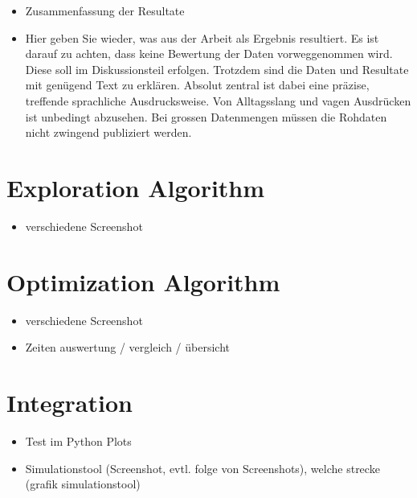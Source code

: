 \begin{itemize}
    \item Zusammenfassung der Resultate
    \item Hier geben Sie wieder, was aus der Arbeit als Ergebnis resultiert. Es ist darauf zu achten, dass keine Bewertung der Daten vorweggenommen wird. Diese soll im Diskussionsteil erfolgen. Trotzdem sind die Daten und Resultate mit genügend Text zu erklären. Absolut zentral ist dabei eine präzise, treffende sprachliche Ausdrucksweise. Von Alltagsslang und vagen Ausdrücken ist unbedingt abzusehen.
    Bei grossen Datenmengen müssen die Rohdaten nicht zwingend publiziert werden.
\end{itemize}

\section{Exploration Algorithm}
\begin{itemize}
    \item verschiedene Screenshot
\end{itemize}

\section{Optimization Algorithm}
\begin{itemize}
    \item verschiedene Screenshot
    \item Zeiten auswertung / vergleich / übersicht
\end{itemize}

\section{Integration}
\begin{itemize}
    \item Test im Python Plots
    \item Simulationstool (Screenshot, evtl. folge von Screenshots), welche strecke (grafik simulationstool)
\end{itemize}

